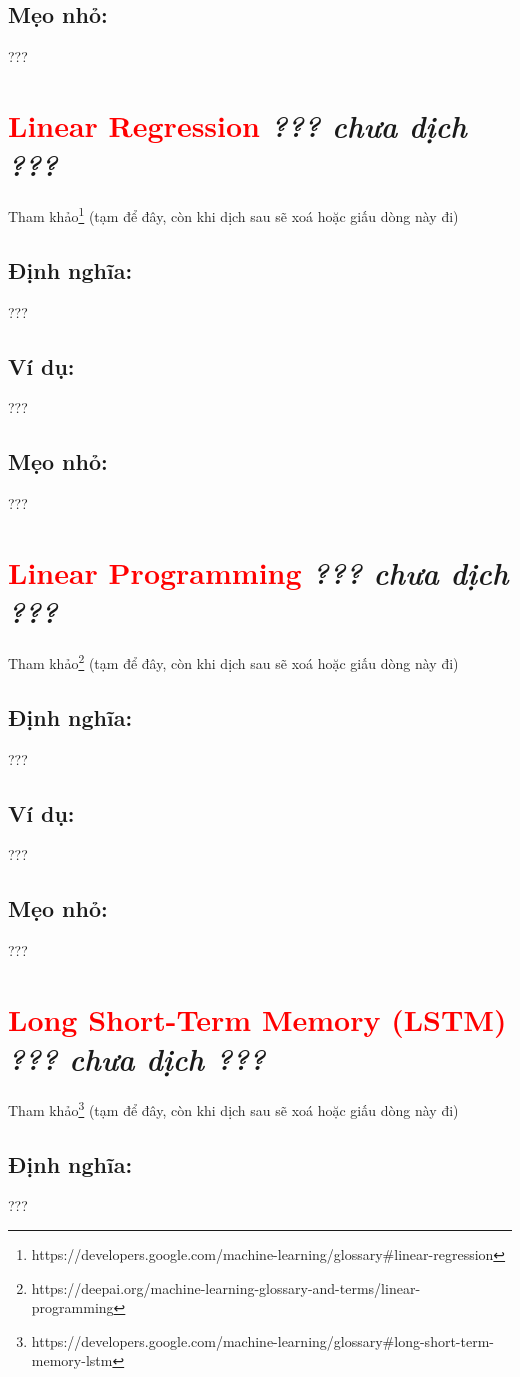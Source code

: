 \subsection*{Mẹo nhỏ:}
???
\section*{\huge \textcolor{Red}{Linear Regression}  \small \textit{??? chưa dịch ???} }
Tham khảo\footnote{https://developers.google.com/machine-learning/glossary\#linear-regression} (tạm để đây, còn khi dịch sau sẽ xoá hoặc giấu dòng này đi)
\subsection*{Định nghĩa:}
???
\subsection*{Ví dụ:}
???
\subsection*{Mẹo nhỏ:}
???
\section*{\huge \textcolor{Red}{Linear Programming}  \small \textit{??? chưa dịch ???} }
Tham khảo\footnote{https://deepai.org/machine-learning-glossary-and-terms/linear-programming} (tạm để đây, còn khi dịch sau sẽ xoá hoặc giấu dòng này đi)
\subsection*{Định nghĩa:}
???
\subsection*{Ví dụ:}
???
\subsection*{Mẹo nhỏ:}
???
\section*{\huge \textcolor{Red}{Long Short-Term Memory (LSTM)}  \small \textit{??? chưa dịch ???} }
Tham khảo\footnote{https://developers.google.com/machine-learning/glossary\#long-short-term-memory-lstm} (tạm để đây, còn khi dịch sau sẽ xoá hoặc giấu dòng này đi)
\subsection*{Định nghĩa:}
???
